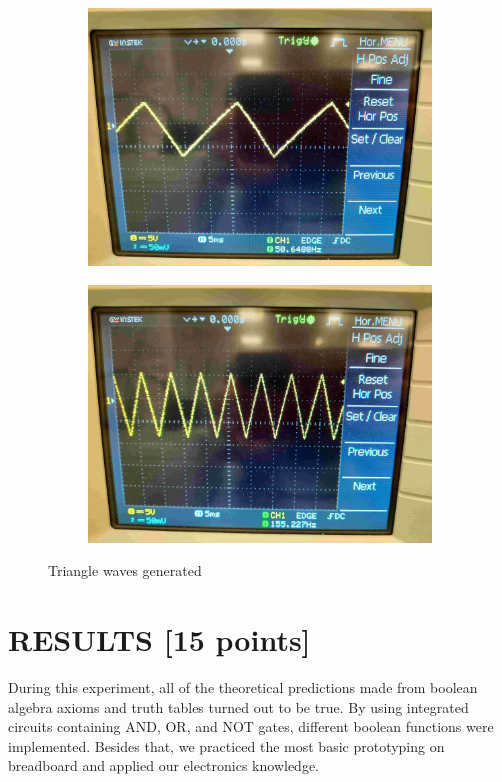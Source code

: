 \documentclass[pdftex,12pt,a4paper]{article}
\begin{document}
\begin{itemize}
\begin{figure}
\begin{subfigure}{0.5\textwidth}
\centering
\includegraphics[width=.95\linewidth]{triangle_wave_1.jpg}
\end{subfigure}%
\begin{subfigure}{0.5\textwidth}
\centering
\includegraphics[width=.95\linewidth]{triangle_wave_2.jpg}
\end{subfigure}
\caption{Triangle waves generated}
\end{figure}    
    
\end{itemize}
\section{RESULTS [15 points]}
During this experiment, all of the theoretical predictions made from boolean algebra axioms and truth tables turned out to be true. By using integrated circuits containing AND, OR, and NOT gates, different boolean functions were implemented. Besides that, we practiced the most basic prototyping on breadboard and applied our electronics knowledge. 
\end{document}
